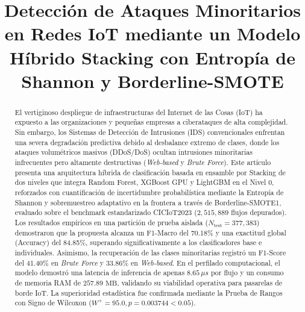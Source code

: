 \documentclass[conference]{IEEEtran}
\begin{document}
\title{Detección de Ataques Minoritarios en Redes IoT mediante un Modelo Híbrido Stacking con Entropía de Shannon y Borderline-SMOTE}

\author{
}

\maketitle

\begin{abstract}
El vertiginoso despliegue de infraestructuras del Internet de las Cosas (IoT) ha expuesto a las organizaciones y pequeñas empresas a ciberataques de alta complejidad. Sin embargo, los Sistemas de Detección de Intrusiones (IDS) convencionales enfrentan una severa degradación predictiva debido al desbalance extremo de clases, donde los ataques volumétricos masivos (DDoS/DoS) ocultan intrusiones minoritarias infrecuentes pero altamente destructivas (\textit{Web-based} y \textit{Brute Force}). Este artículo presenta una arquitectura híbrida de clasificación basada en ensamble por Stacking de dos niveles que integra Random Forest, XGBoost GPU y LightGBM en el Nivel 0, reforzados con cuantificación de incertidumbre probabilística mediante la Entropía de Shannon y sobremuestreo adaptativo en la frontera a través de Borderline-SMOTE1, evaluado sobre el benchmark estandarizado CICIoT2023 ($2,515,889$ flujos depurados). Los resultados empíricos en una partición de prueba aislada ($N_{\mathrm{test}} = 377,383$) demostraron que la propuesta alcanza un F1-Macro del 70.18\% y una exactitud global (Accuracy) del 84.85\%, superando significativamente a los clasificadores base e individuales. Asimismo, la recuperación de las clases minoritarias registró un F1-Score del 41.40\% en \textit{Brute Force} y 33.86\% en \textit{Web-based}. En el perfilado computacional, el modelo demostró una latencia de inferencia de apenas $8.65\,\mu s$ por flujo y un consumo de memoria RAM de $257.89\text{ MB}$, validando su viabilidad operativa para pasarelas de borde IoT. La superioridad estadística fue confirmada mediante la Prueba de Rangos con Signo de Wilcoxon ($W^+ = 95.0, p = 0.003744 < 0.05$).
\end{abstract}
\end{document}
